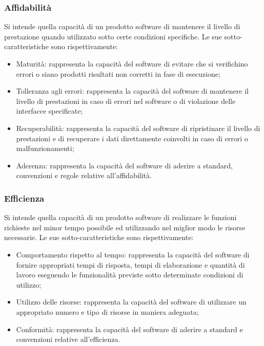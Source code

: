 \subsubsection{Affidabilità}
Si intende quella capacità di un prodotto software di mantenere il livello di prestazione quando utilizzato sotto certe condizioni specifiche.
Le sue sotto-caratteristiche sono rispettivamente:
\begin{itemize}
\item Maturità: rappresenta la capacità del software di evitare che si verifichino errori o siano prodotti risultati non corretti in fase di esecuzione;
\item Tolleranza agli errori: rappresenta la capacità del software  di mantenere il livello di prestazioni in caso di errori nel software o di violazione delle interfacce specificate;
\item Recuperabilità: rappresenta la capacità del software di ripristinare il livello di prestazioni e di recuperare i dati direttamente coinvolti in caso di errori o malfunzionamenti;
\item Aderenza: rappresenta la capacità del software di aderire a standard, convenzioni e regole relative all'affidabilità.
\end{itemize}

\subsubsection{Efficienza}
Si intende quella capacità di un prodotto software di realizzare le funzioni richieste nel minor tempo possibile ed utilizzando nel miglior modo le risorse necessarie.
Le sue sotto-caratteristiche sono rispettivamente:
\begin{itemize}
\item Comportamento rispetto al tempo: rappresenta la capacità del software di fornire appropriati tempi di risposta, tempi di elaborazione e quantità di lavoro eseguendo le funzionalità previste sotto determinate condizioni di utilizzo;
\item Utilizzo delle risorse: rappresenta la capacità del software di utilizzare un appropriato numero e tipo di risorse in maniera adeguata;
\item Conformità: rappresenta la capacità del software di aderire a standard e convenzioni relative all'efficienza.
\end{itemize}

